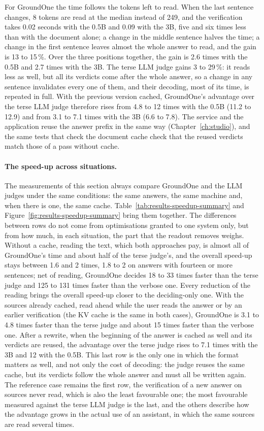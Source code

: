 For GroundOne the time follows the tokens left to read. When the last sentence changes, 8 tokens are read at the median
instead of 249, and the verification takes 0.02 seconds with the 0.5B and 0.09 with the 3B, five and six times less than
with the document alone; a change in the middle sentence halves the time; a change in the first sentence leaves almost
the whole answer to read, and the gain is 13 to 15\,\%. Over the three positions together, the gain is 2.6 times with the
0.5B and 2.7 times with the 3B. The terse LLM judge gains 3 to 29\,\%: it reads less as well, but all its verdicts come
after the whole answer, so a change in any sentence invalidates every one of them, and their decoding, most of its time,
is repeated in full. With the previous version cached, GroundOne's advantage over the terse LLM judge therefore rises
from 4.8 to 12 times with the 0.5B (11.2 to 12.9) and from 3.1 to 7.1 times with the 3B (6.6 to 7.8). The service and
the application reuse the answer prefix in the same way (Chapter~\ref{ch:studio}), and the same tests that check the
document cache check that the reused verdicts match those of a pass without cache.

\paragraph{The speed-up across situations.} The measurements of this section always compare GroundOne and the LLM
judges under the same conditions: the same answers, the same machine and, when there is one, the same cache.
Table~\ref{tab:results-speedup-summary} and Figure~\ref{fig:results-speedup-summary} bring them together. The differences between rows do not come from
optimisations granted to one system only, but from how much, in each situation, the part that the readout removes
weighs. Without a cache, reading the text, which both approaches pay, is almost all of GroundOne's time and about half of
the terse judge's, and the overall speed-up stays between 1.6 and 2 times, 1.8 to 2 on answers with fourteen or more sentences; net of reading, GroundOne decides 18 to 33
times faster than the terse judge and 125 to 131 times faster than the verbose one. Every reduction of the reading
brings the overall speed-up closer to the deciding-only one. With the sources already cached, read ahead while the user
reads the answer or by an earlier verification (the KV cache is the same in both cases), GroundOne is 3.1 to 4.8 times
faster than the terse judge and about 15 times faster than the verbose one. After a rewrite, when the beginning of the
answer is cached as well and its verdicts are reused, the advantage over the terse judge rises to 7.1 times with the 3B
and 12 with the 0.5B. This last row is the only one in which the format matters as well, and not only the cost of
decoding: the judge reuses the same cache, but its verdicts follow the whole answer and must all be written again. The reference case remains the first row, the verification of a new answer on sources never read, which is also the least favourable one; the most favourable measured against the terse LLM judge is the last, and the others describe how
the advantage grows in the actual use of an assistant, in which the same sources are read several times.

